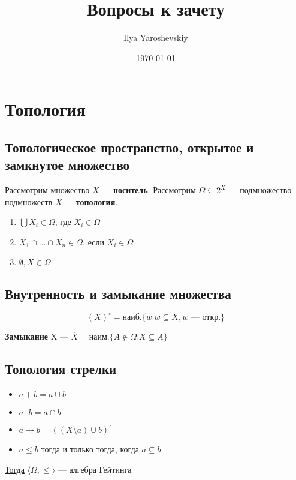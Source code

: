 \documentclass[english]{article}
\author{Ilya Yaroshevskiy}
\date{\today}
\title{Вопросы к зачету}
\begin{document}
\maketitle
\tableofcontents

\renewcommand{\P}{\mathcal{P}}


\section{Топология}
\label{sec:orgeb79e4c}
\subsection{Топологическое пространство, открытое и замкнутое множество}
\label{sec:orgbde94b4}
\begin{definition}
	Рассмотрим множество \(X\) --- \textbf{носитель}. Рассмотрим \(\Omega \subseteq 2^X\) --- подмножество подмножеств \(X\) --- \textbf{топология}.
	\begin{enumerate}
		\item \(\bigcup X_i \in \Omega\), где \(X_i \in \Omega\)
		\item \(X_1 \cap \dots \cap X_n \in \Omega\), если \(X_i \in \Omega\)
		\item \(\emptyset, X \in \Omega\)
	\end{enumerate}
	\label{orgfa61403}
\end{definition}
\subsection{Внутренность и замыкание множества}
\label{sec:org12becc3}
\begin{definition}
	\[ (X)^\circ = \text{наиб.}\{w \big| w \subseteq X, w\text{ --- откр.} \} \]
	\label{org35bd421}
\end{definition}
\begin{definition}
	\textbf{Замыкание} X --- \(\overline{X} = \text{наим.}\{A \not\in \Omega \big| X \subseteq A \}\)
\end{definition}
\subsection{Топология стрелки}
\label{sec:org0f76dfb}
\begin{theorem}
	\-
	\begin{itemize}
		\item \(a + b = a \cup b\)
		\item \(a \cdot b = a \cap b\)
		\item \(a \to b = \left((X \setminus a) \cup b\right)^\circ\)
		\item \(a \le b\) тогда и только тогда, когда \(a \subseteq b\)
	\end{itemize}
	\uline{Тогда} \(\langle \Omega, \le \rangle\) --- алгебра Гейтинга
	\label{org945182c}
\end{theorem}
\end{document}

